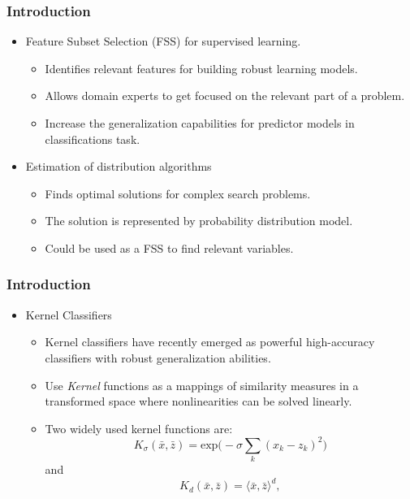 \begin{frame}
\frametitle{Introduction}
\begin{itemize}
	\item Feature Subset Selection (FSS) for supervised learning.
	\begin{itemize}
		\pause
		\item Identifies relevant features for building robust learning models.
		\item Allows domain experts to get focused on the relevant part of a problem. 
		\item Increase the generalization capabilities for predictor models in classifications task.
	\end{itemize}
	\pause
	\item Estimation of distribution algorithms
	\begin{itemize}
		\pause
		\item Finds optimal solutions for complex search problems.
		\pause
		\item The solution is represented by probability distribution model.
		\pause
		\item Could be used as a FSS to find relevant variables.
	\end{itemize}
\end{itemize}
\end{frame}
\begin{frame}
\frametitle{Introduction}
\begin{itemize}
	\item Kernel Classifiers
	\pause
	\begin{itemize}
		\item Kernel classifiers  have recently emerged as powerful high-accuracy classifiers with robust generalization abilities.
		\item Use \emph{Kernel} functions as a mappings of similarity measures in a transformed space where nonlinearities can be solved linearly.
		\item Two widely used kernel functions are: \pause
					\begin{equation}
					K_{\sigma}(\bar{x},\bar{z}) = \text{exp}\Big( -\sigma\sum_{k} (x_k-z_k)^2 \Big)
					\label{eq:eq01}
				\end{equation} and
				\begin{equation}
					K_d(\bar{x},\bar{z}) = \langle \bar{x}, \bar{z} \rangle^d,
					\label{eq:eq02}
				\end{equation}

	\end{itemize}
\end{itemize}
\end{frame}